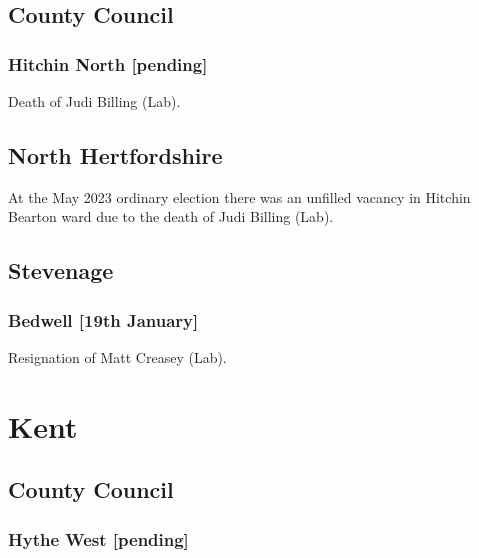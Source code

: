 \documentclass[a4paper,openany]{book}
\begin{document}
\begin{resultsiii}
\subsection*{County Council}

\subsubsection*{Hitchin North \hspace*{\fill}\nolinebreak[1]%
	\enspace\hspace*{\fill}
	[pending]}


Death of Judi Billing (Lab).

\subsection*{North Hertfordshire}

At the May 2023 ordinary election there was an unfilled vacancy in Hitchin Bearton ward due to the death of Judi Billing (Lab).%

\subsection*{Stevenage}

\subsubsection*{Bedwell \hspace*{\fill}\nolinebreak[1]%
	\enspace\hspace*{\fill}
	[19th January]}


Resignation of Matt Creasey (Lab).

\section{Kent}

\subsection*{County Council}

\subsubsection*{Hythe West \hspace*{\fill}\nolinebreak[1]%
	\enspace\hspace*{\fill}
	[pending]}


\end{resultsiii}
\end{document}
